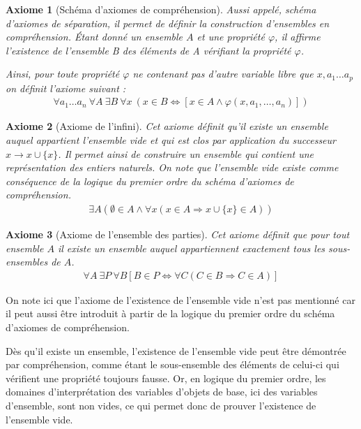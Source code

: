 \documentclass[10pt,a4paper]{article}
\newtheorem{axiom}{Axiome}[section]
\begin{document}
{\begin{axiom}[Schéma d'axiomes de compréhension] Aussi appelé, schéma d'axiomes de séparation, il permet de définir la construction d'ensembles en compréhension. Étant donné un ensemble $A$ et une propriété $\varphi$, il affirme l'existence de l'ensemble B des éléments de A vérifiant la propriété $\varphi$.

Ainsi, pour toute propriété $\varphi$ ne contenant pas d'autre variable libre que $x, a_1 \ldots a_p$ on définit l'axiome suivant :
\begin{align}
\forall a_1 \ldots a_n \ \forall A \ \exists B \ \forall x \ \left( x \in B \Leftrightarrow \left[ x \in A \wedge \varphi \left(x, a_1, \ldots, a_n \right) \right] \right) 
\end{align}
\end{axiom}

\begin{axiom}[Axiome de l'infini] Cet axiome définit qu'il existe un ensemble auquel appartient l'ensemble vide et qui est clos par application du successeur$ x \rightarrow x \cup \{x\}$. Il permet ainsi de construire un ensemble qui contient une représentation des entiers naturels. On note que l'ensemble vide existe comme conséquence de la logique du premier ordre du schéma d'axiomes de compréhension.
\begin{align}
\exists A \left( \emptyset \in A \land \forall x (x \in A \Rightarrow x \cup \{x\} \in A) \right) 
\end{align}
\end{axiom}

\begin{axiom}[Axiome de l'ensemble des parties] Cet axiome définit que pour tout ensemble $A$ il existe un ensemble auquel appartiennent exactement tous les sous-ensembles de $A$.
\begin{align}
\forall A \ \exists P \ \forall B \left[B \in P \Leftrightarrow \forall C \left( C \in B \Rightarrow C \in A \right) \right] 
\end{align}
\end{axiom}

On note ici que l'axiome de l'existence de l'ensemble vide n'est pas mentionné car il peut aussi être introduit à partir de la logique du premier ordre du schéma d'axiomes de compréhension.

Dès qu'il existe un ensemble, l'existence de l'ensemble vide peut être démontrée par compréhension, comme étant le sous-ensemble des éléments de celui-ci qui vérifient une propriété toujours fausse.
Or, en logique du premier ordre, les domaines d'interprétation des variables d'objets de base, ici des variables d'ensemble, sont non vides, ce qui permet donc de prouver l'existence de l'ensemble vide.

}
\end{document}
